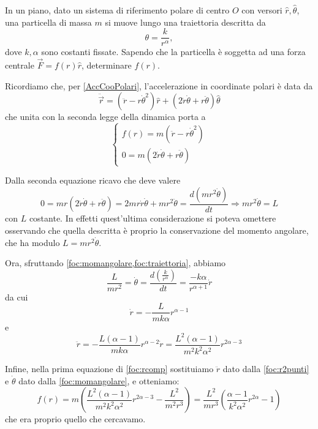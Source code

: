 \documentclass[../main.tex]{subfiles}
\begin{document}

\textex
In un piano, dato un sistema di riferimento polare di centro $O$ con versori $\hat{r},\hat{\theta}$, una particella di massa $m$ si muove lungo una traiettoria descritta da
\begin{equation}
	\label{foc:traiettoria}
	\theta=\frac{k}{r^\alpha},
\end{equation}
dove $k, \alpha$ sono costanti fissate. Sapendo che la particella \`e soggetta ad una forza centrale $\vec{F}=f(r)\hat{r}$, determinare $f(r)$.

\solution

Ricordiamo che, per \cref{AccCooPolari}, l'accelerazione in coordinate polari \`e data da
\begin{equation*}
	\ddot{\vec{r}}=(\ddot{r}-r\dot{\theta}^2)\hat{r}+(2\dot{r}\dot{\theta}+r\ddot{\theta})\hat{\theta}
\end{equation*}
che unita con la seconda legge della dinamica porta a
\begin{equation}
\begin{cases}
	f(r)=m(\ddot{r}-r\dot{\theta}^2) \label{foc:rcomp}\\
	0=m(2\dot{r}\dot{\theta}+r\ddot{\theta})
\end{cases}
\end{equation}

Dalla seconda equazione ricavo che deve valere
\begin{equation}\label{foc:momangolare}
	0=mr(2\dot{r}\dot{\theta}+r\ddot{\theta})=2mr\dot{r}\dot{\theta}+mr^2\ddot{\theta}=\frac{d(mr^2\dot{\theta})}{dt} \Longrightarrow mr^2\dot{\theta}=L
\end{equation}
con $L$ costante. In effetti quest'ultima considerazione si poteva omettere osservando che quella descritta è proprio la conservazione del momento angolare, che ha modulo $L=mr^2\dot{\theta}$.

Ora, sfruttando \cref{foc:momangolare,foc:traiettoria}, abbiamo
\begin{equation*}
	\frac{L}{mr^2}=\dot\theta=\frac{d\left(\frac{k}{r^{\alpha}}\right)}{dt}=\frac{-k\alpha}{r^{\alpha+1}}\dot{r}
\end{equation*}
da cui
\begin{equation*}
	\dot{r}=-\frac{L}{mk\alpha}r^{\alpha-1}
\end{equation*}
e
\begin{equation}
	\label{foc:r2punti}
	\ddot{r}=-\frac{L(\alpha-1)}{mk\alpha}r^{\alpha-2}\dot{r}=\frac{L^2(\alpha-1)}{m^2k^2\alpha^2}r^{2\alpha-3}
\end{equation}

Infine, nella prima equazione di \cref{foc:rcomp} sostituiamo $\ddot{r}$ dato dalla \cref{foc:r2punti} e $\dot{\theta}$ dato dalla \cref{foc:momangolare}, e otteniamo:
\begin{equation*}
	f(r)=m\left(\frac{L^2(\alpha-1)}{m^2k^2\alpha^2}r^{2\alpha-3}-\frac{L^2}{m^2r^3}\right)
	=\frac{L^2}{mr^3}\left(\frac{\alpha-1}{k^2\alpha^2}r^{2\alpha}-1\right)
\end{equation*}
che era proprio quello che cercavamo.
\end{document}
